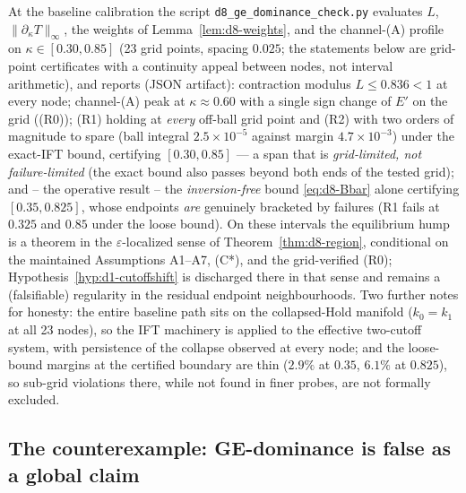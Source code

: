 \begin{corollary}
\label{cor:d8-baseline}
At the baseline calibration the script \texttt{d8\_ge\_dominance\_check.py} evaluates $L$, $\|\partial_\kappa T\|_\infty$, the weights of Lemma~\ref{lem:d8-weights}, and the channel-(A) profile on $\kappa\in[0.30,0.85]$ (23 grid points, spacing $0.025$; the statements below are grid-point certificates with a continuity appeal between nodes, not interval arithmetic), and reports (JSON artifact): contraction modulus $L\le0.836<1$ at every node; channel-(A) peak at $\kappa\approx0.60$ with a single sign change of $E'$ on the grid (\textup{(R0)}); \textup{(R1)} holding at \emph{every} off-ball grid point and \textup{(R2)} with two orders of magnitude to spare (ball integral $2.5\times10^{-5}$ against margin $4.7\times10^{-3}$) under the exact-IFT bound, certifying $[0.30,0.85]$ --- a span that is \emph{grid-limited, not failure-limited} (the exact bound also passes beyond both ends of the tested grid); and -- the operative result -- the \emph{inversion-free} bound \eqref{eq:d8-Bbar} alone certifying $[0.35,0.825]$, whose endpoints \emph{are} genuinely bracketed by failures (R1 fails at $0.325$ and $0.85$ under the loose bound). On these intervals the equilibrium hump is a theorem in the $\varepsilon$-localized sense of Theorem~\ref{thm:d8-region}, conditional on the maintained Assumptions \textup{A1--A7}, \textup{(C*)}, and the grid-verified \textup{(R0)}; Hypothesis~\ref{hyp:d1-cutoffshift} is discharged there in that sense and remains a (falsifiable) regularity in the residual endpoint neighbourhoods. Two further notes for honesty: the entire baseline path sits on the collapsed-Hold manifold ($k_{0}=k_{1}$ at all 23 nodes), so the IFT machinery is applied to the effective two-cutoff system, with persistence of the collapse observed at every node; and the loose-bound margins at the certified boundary are thin ($2.9\%$ at $0.35$, $6.1\%$ at $0.825$), so sub-grid violations there, while not found in finer probes, are not formally excluded.
\end{corollary}

\subsection{The counterexample: GE-dominance is false as a global claim}
\label{app:d8-counter}

